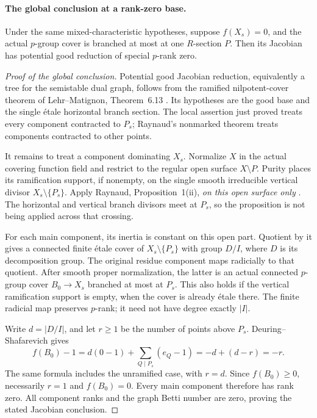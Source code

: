\paragraph{The global conclusion at a rank-zero base.}
Under the same mixed-characteristic hypotheses, suppose
\(f(X_s)=0\), and the actual \(p\)-group cover is
branched at most at one \(R\)-section \(P\).
Then its Jacobian has potential good reduction of
special \(p\)-rank zero.

\begin{proof}[Proof of the global conclusion]
Potential good Jacobian reduction, equivalently a tree
for the semistable dual graph, follows from the ramified
nilpotent-cover theorem of Lehr--Matignon,
Theorem~6.13 \cite{fghLehrMatignon2005}. Its hypotheses
are the good base and the single \'etale horizontal branch
section. The local assertion just proved treats every
component contracted to \(P_s\); Raynaud's nonmarked
theorem treats components contracted to other points.

It remains to treat a component dominating \(X_s\).
Normalize \(X\) in the actual covering function field
and restrict to the regular open surface \(X\setminus P\).
Purity places its ramification support, if nonempty, on
the single smooth irreducible vertical divisor
\(X_s\setminus\{P_s\}\). Apply Raynaud,
Proposition~1(ii), \emph{on this open surface only}
\cite{fghRaynaud1990Pgroups}. The horizontal and vertical branch
divisors meet at \(P_s\), so the proposition is not
being applied across that crossing.

For each main component, its inertia is constant on this
open part. Quotient by it gives a connected finite \'etale
cover of \(X_s\setminus\{P_s\}\) with group \(D/I\),
where \(D\) is its decomposition group. The original
residue component maps radicially to that quotient.
After smooth proper normalization, the latter is an actual
connected \(p\)-group cover \(B_0\to X_s\) branched
at most at \(P_s\). This also holds if the vertical
ramification support is empty, when the cover is already
\'{e}tale there. The finite radicial map preserves
\(p\)-rank; it need not have degree exactly \(|I|\).

Write \(d=|D/I|\), and let \(r\ge1\) be the number
of points above \(P_s\). Deuring--Shafarevich \cite[Corollary 1.8]{fghCrew1984} gives
\[
 f(B_0)-1=d(0-1)+\sum_{Q\mid P_s}(e_Q-1)
              =-d+(d-r)=-r.                            \tag{A.78.5}
\]
The same formula includes the unramified case, with
\(r=d\). Since \(f(B_0)\ge0\), necessarily \(r=1\)
and \(f(B_0)=0\). Every main component therefore has
rank zero. All component ranks and the graph Betti number
are zero, proving the stated Jacobian conclusion.
\end{proof}

